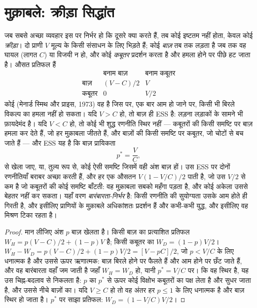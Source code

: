 \section{मुक़ाबले: क्रीड़ा सिद्धांत}

\begin{proposition}[बाज़--कबूतर और विकासीय रूप से स्थिर रणनीति]\label{prop:b3:behavioural-ecology:hawk-dove}
जब सबसे अच्छा व्यवहार इस पर निर्भर हो कि दूसरे क्या करते हैं, तब कोई
इष्टतम नहीं होता, केवल कोई \emph{क्रीड़ा}। दो प्राणी $V$ मूल्य के किसी
संसाधन के लिए भिड़ते हैं; कोई \emph{बाज़} तब तक लड़ता है जब तक वह घायल
(लागत $C$) या विजयी न हो, और कोई \emph{कबूतर} प्रदर्शन करता है और हमला
होने पर पीछे हट जाता है। औसत प्रतिफल हैं
\[
\begin{array}{c|cc}
 & \text{बनाम बाज़} & \text{बनाम कबूतर}\\ \hline
\text{बाज़} & (V - C)/2 & V\\
\text{कबूतर} & 0 & V/2
\end{array}
\]
कोई \emph{} (मेनार्ड स्मिथ और प्राइस, 1973)
वह है जिस पर, एक बार आम हो जाने पर, किसी भी बिरले विकल्प का हमला नहीं
हो सकता। यदि $V > C$ हो, तो बाज़ ही ESS है: लड़ना लड़ाकों के सामने भी
फ़ायदेमंद है। यदि $V
< C$ हो, तो कोई भी शुद्ध रणनीति स्थिर नहीं --- कबूतरों की किसी समष्टि
पर बाज़ हमला कर देते हैं, जो हर मुक़ाबला जीतते हैं, और बाज़ों की किसी
समष्टि पर कबूतर, जो चोटों से बच जाते हैं --- और ESS यह है कि बाज़
प्रायिकता
\[
p^{*} = \frac{V}{C},
\]
से खेला जाए, या, तुल्य रूप से, कोई ऐसी समष्टि जिसमें वही अंश बाज़ हों।
उस ESS पर दोनों रणनीतियाँ बराबर अच्छा करती हैं, और हर एक औसतन $V(1 -
V/C)/2$ पाती है, जो उस $V/2$ से कम है जो कबूतरों की कोई समष्टि
बाँटती: वह मुक़ाबला सबको महँगा पड़ता है, और कोई अकेला उससे बेहतर नहीं कर
सकता। यहाँ वरण \emph{बारंबारता-निर्भर} है: किसी रणनीति की सुयोग्यता उसके
आम होते ही गिरती है, और इसीलिए प्राणियों के मुक़ाबले अधिकांशतः प्रदर्शन
हैं और कभी-कभी युद्ध, और इसीलिए वह मिश्रण टिका रहता है।
\end{proposition}
\begin{proof}
मान लीजिए अंश $p$ बाज़ खेलता है। किसी बाज़ का प्रत्याशित प्रतिफल
$W_{H} = p(V
- C)/2 + (1 - p)V$ है; किसी कबूतर का $W_{D} = (1 - p)V/2$।
$W_{H} - W_{D} =
p(V - C)/2 + (1 - p)V/2 = [V - pC]/2$, जो $p < V/C$ के लिए धनात्मक है
और उससे ऊपर ऋणात्मक: बाज़ बिरले होने पर फैलते हैं और आम होने पर छँट
जाते हैं, और वह बारंबारता वहाँ जम जाती है जहाँ $W_{H} = W_{D}$ हो,
यानी $p^{*} = V/C$ पर। कि वह स्थिर है, यह उस चिह्न-बदलाव से निकलता है:
$p$ का $p^{*}$ से ऊपर कोई विक्षोभ कबूतरों का पक्ष लेता है और सुधर जाता
है, और उससे नीचे बाज़ों का। यदि $V
\ge C$ हो तो वह अंतर हर $p \le 1$ के लिए धनात्मक है और बाज़ स्थिर हो
जाता है। $p^{*}$ पर साझा प्रतिफल: $W_{D} = (1 - V/C)V/2$।
\end{proof}

